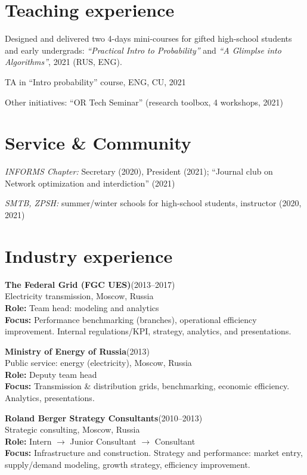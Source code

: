 \documentclass[11pt]{article} \usepackage{geometry} %
\newcommand{\jobl}[5]{%
  \textbf{#1}\hfill (#2)\\
  #3\vspace{0.25em}\\
  \textbf{Role:} #4\\
  \textbf{Focus:} #5}
\newcommand{\job}[5]{%
  \jobl{#1}{#2}{#3}{#4}{#5}\vspace{0.5em}
}
\begin{document}
 \begin{minipage}[t]{0.49\textwidth}
   \section*{Teaching experience}
   Designed and delivered  two 4-days mini-courses for gifted
   high-school students and early undergrads: \textit{``Practical Intro to Probability''}
   and \textit{``A Glimplse into Algorithms''}, 2021 (RUS, ENG).

   TA in ``Intro probability'' course, ENG, CU, 2021\vspace{0.3em}

   Other initiatives: ``OR Tech Seminar'' (research toolbox, 4 workshops, 2021)
   
   \section*{Service \& Community}
   \textit{INFORMS Chapter:} Secretary (2020),
   President (2021); 
   ``Journal club on Network optimization and interdiction'' (2021)

   \textit{SMTB, ZPSH:} summer/winter schools for high-school students, 
   instructor (2020, 2021)\\
   
   \section*{Industry experience}
   \job{The Federal Grid (FGC UES)}{2013--2017}{Electricity transmission,
     Moscow, Russia}{Team head: modeling and analytics}{Performance
     benchmarking (branches), operational efficiency improvement. Internal
     regulations/KPI, strategy, analytics, and presentations.}

   \job{Ministry of Energy of Russia}{2013}{Public service: energy
     (electricity), Moscow, Russia}{Deputy team head}{Transmission \&
     distribution grids, benchmarking, economic efficiency.
     Analytics, presentations.}

   \jobl{Roland Berger Strategy Consultants}{2010--2013}{Strategic consulting,
     Moscow, Russia}{ Intern $\rightarrow$ Junior
     Consultant $\rightarrow$ Consultant}{Infrastructure and construction.
     Strategy and performance: market entry, supply/demand modeling, growth
     strategy, efficiency improvement.}
 \end{minipage}
\end{document}
